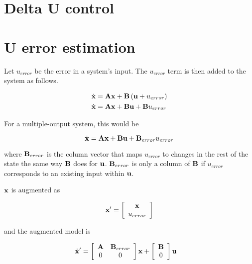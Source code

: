 \section{Delta U control}

\section{U error estimation}

Let $u_{error}$ be the error in a system's input. The $u_{error}$ term is then
added to the system as follows.

\begin{align*}
  \dot{\mathbf{x}} &= \mathbf{A}\mathbf{x} + \mathbf{B}\left(\mathbf{u} + u_{error}\right) \\
  \dot{\mathbf{x}} &= \mathbf{A}\mathbf{x} + \mathbf{B}\mathbf{u} + \mathbf{B}u_{error}
\end{align*}

For a multiple-output system, this would be

\begin{equation*}
  \dot{\mathbf{x}} = \mathbf{A}\mathbf{x} + \mathbf{B}\mathbf{u} + \mathbf{B}_{error}u_{error}
\end{equation*}

where $\mathbf{B}_{error}$ is the column vector that maps $u_{error}$ to changes in
the rest of the state the same way $\mathbf{B}$ does for $\mathbf{u}$.
$\mathbf{B}_{error}$ is only a column of $\mathbf{B}$ if $u_{error}$ corresponds to an
existing input within $\mathbf{u}$.

$\mathbf{x}$ is augmented as

\begin{equation*}
  \mathbf{x'} = \left[
  \begin{array}{c}
    \mathbf{x} \\
    u_{error}
  \end{array}
  \right]
\end{equation*}

and the augmented model is

\begin{align*}
  \dot{\mathbf{x}}' &= \left[
  \begin{array}{cc}
    \mathbf{A} & \mathbf{B}_{error} \\
    0 & 0
  \end{array}
  \right] \mathbf{x} + \left[
  \begin{array}{c}
    \mathbf{B} \\
    0
  \end{array}
  \right] \mathbf{u}
\end{align*}

